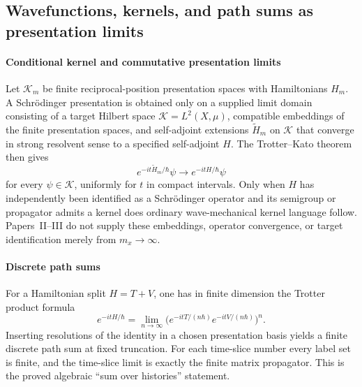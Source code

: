 \documentclass[12pt,a4paper]{article}
\begin{document}
\subsection{Wavefunctions, kernels, and path sums as presentation limits}
\label{p4:sec:part2-wave-path}



\paragraph{Conditional kernel and commutative presentation limits}
\label{p4:sec:part2-kernel-limit}

Let \(\mathcal K_m\) be finite reciprocal-position presentation spaces with Hamiltonians
\(H_m\).  A Schr\"odinger presentation is obtained only on a supplied limit
domain consisting of a target Hilbert space
\(\mathcal K=L^2(X,\mu)\), compatible embeddings of the finite presentation spaces, and
self-adjoint extensions \(\widetilde H_m\) on \(\mathcal K\) that converge in
strong resolvent sense to a specified self-adjoint \(H\).  The
Trotter--Kato theorem then gives
\[
e^{-it\widetilde H_m/\hbar}\psi
\longrightarrow
e^{-itH/\hbar}\psi
\]
for every \(\psi\in\mathcal K\), uniformly for \(t\) in compact intervals.
Only when \(H\) has independently been identified as a Schr\"odinger operator
and its semigroup or propagator admits a kernel does ordinary wave-mechanical
kernel language follow.  Papers~II--III do not supply these embeddings,
operator convergence, or target identification merely from \(m_x\to\infty\).



\paragraph{Discrete path sums}
\label{p4:sec:part2-path-sums}

For a Hamiltonian split $H=T+V$, one has in finite dimension the Trotter product formula
\begin{equation}
\label{p4:eq:trotter}
e^{-itH/\hbar}
=\lim_{n\to\infty}
\bigl(e^{-itT/(n\hbar)}e^{-itV/(n\hbar)}\bigr)^n.
\end{equation}
Inserting resolutions of the identity in a chosen presentation basis yields a finite discrete path sum at fixed truncation.
For each time-slice number every label set is finite, and the time-slice limit
is exactly the finite matrix propagator.  This is the proved algebraic
``sum over histories'' statement.
\end{document}
